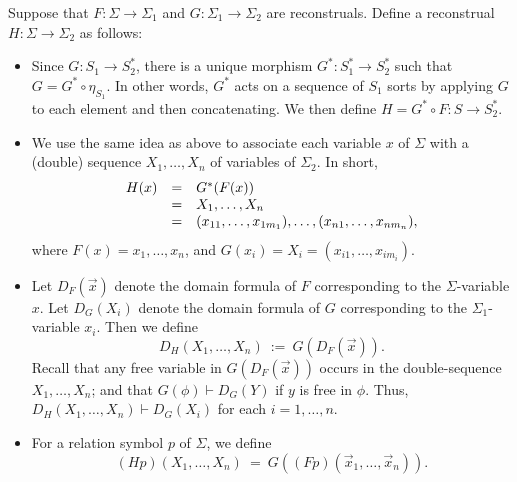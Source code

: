 \begin{defn} Suppose that
  $F:\Sigma\to \Sigma _1$ and $G:\Sigma _1\to \Sigma _2$ are
  reconstruals.  Define a reconstrual $H:\Sigma \to\Sigma _2$ as
  follows:
  \begin{itemize}
  \item Since $G:S_1\to S_2^*$, there is a unique morphism
    $G^*:S_1^*\to S_2^*$ such that $G=G^*\circ \eta _{S_1}$.  In other
    words, $G^*$ acts on a sequence of $S_1$ sorts by applying $G$ to
    each element and then concatenating.  We then define
    $H=G^*\circ F:S\to S^*_2$.
  \item We use the same idea as above to associate each variable $x$
    of $\Sigma$ with a (double) sequence $X_1,\dots ,X_n$ of variables
    of $\Sigma _2$.  In short,
    \[ \begin{array}{l l l} H(x) & = & G^*(F(x))  \\
                                 & = & X_1,\dots
                                       ,X_n \\
                                 & = & (x_{11},\dots ,x_{1m_1}),\dots
                                       ,(x_{n1},\dots ,x_{nm_n})
                                       , \end{array} \] where
                                       $F(x)=x_1,\dots ,x_n$, and
                                       $G(x_i)=X_i=(x_{i1},\dots
                                       ,x_{im_i})$.
    
  \item Let $D_F(\vec{x})$ denote the domain formula of $F$
    corresponding to the $\Sigma$-variable $x$.  Let $D_G(X_i)$ denote
    the domain formula of $G$ corresponding to the
    $\Sigma _1$-variable $x_i$.  Then we define
    \[ D_H(X_1,\dots ,X_n) \: := \: G(D_F(\vec{x})) .\] Recall that
    any free variable in $G(D_F(\vec{x}))$ occurs in the
    double-sequence $X_1,\dots ,X_n$; and that $G(\phi )\vdash D_G(Y)$
    if $y$ is free in $\phi$.  Thus,
    $D_H(X_1,\dots ,X_n)\vdash D_G(X_i)$ for each $i=1,\dots ,n$.
  \item For a relation symbol $p$ of $\Sigma$, we define
    \[ (Hp)(X_1,\dots ,X_n) \: = \: G((Fp)(\vec{x}_1,\dots
      ,\vec{x}_n)) .\] 
   \end{itemize} \end{defn}
